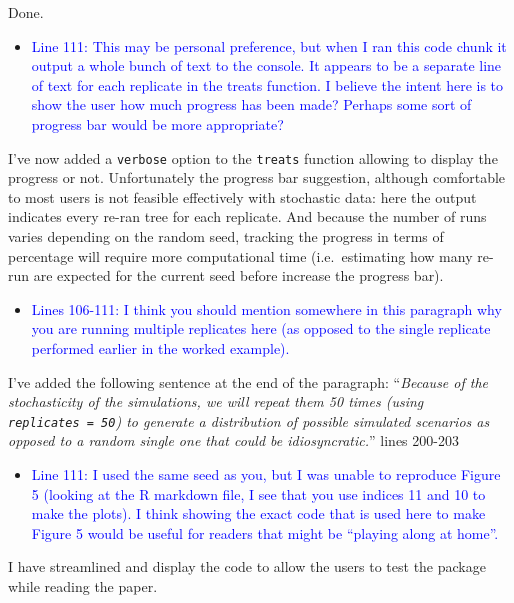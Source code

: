 \documentclass[
]{article}
\providecommand{\tightlist}{%
  \setlength{\itemsep}{0pt}\setlength{\parskip}{0pt}}
\begin{document}
Done.

\begin{itemize}
\tightlist
\item
  \textcolor{blue}{Line 111: This may be personal preference, but when I ran this code
  chunk it output a whole bunch of text to the console. It appears to be
  a separate line of text for each replicate in the treats function. I
  believe the intent here is to show the user how much progress has been
  made? Perhaps some sort of progress bar would be more appropriate?}
\end{itemize}

I've now added a \texttt{verbose} option to the \texttt{treats} function
allowing to display the progress or not. Unfortunately the progress bar
suggestion, although comfortable to most users is not feasible
effectively with stochastic data: here the output indicates every re-ran
tree for each replicate. And because the number of runs varies depending
on the random seed, tracking the progress in terms of percentage will
require more computational time (i.e.~estimating how many re-run are
expected for the current seed before increase the progress bar).

\begin{itemize}
\tightlist
\item
  \textcolor{blue}{Lines 106-111: I think you should mention somewhere in this paragraph
  why you are running multiple replicates here (as opposed to the single
  replicate performed earlier in the worked example).}
\end{itemize}

I've added the following sentence at the end of the paragraph:
``\emph{Because of the stochasticity of the simulations, we will repeat
them 50 times (using \texttt{replicates\ =\ 50}) to generate a
distribution of possible simulated scenarios as opposed to a random
single one that could be idiosyncratic.}'' lines 200-203

\begin{itemize}
\tightlist
\item
  \textcolor{blue}{Line 111: I used the same seed as you, but I was unable to reproduce
  Figure 5 (looking at the R markdown file, I see that you use indices
  11 and 10 to make the plots). I think showing the exact code that is
  used here to make Figure 5 would be useful for readers that might be
  ``playing along at home''.}
\end{itemize}

I have streamlined and display the code to allow the users to test the
package while reading the paper.
\end{document}
